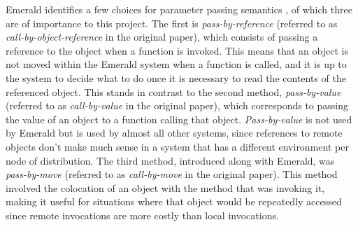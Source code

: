 Emerald identifies a few choices for parameter passing semantics \cite{JulEric1988Fmit}, of which three are of importance to this project. The first is \textit{pass-by-reference} (referred to as \textit{call-by-object-reference} in the original paper), which consists of passing a reference to the object when a function is invoked. This means that an object is not moved within the Emerald system when a function is called, and it is up to the system to decide what to do once it is necessary to read the contents of the referenced object. This stands in contrast to the second method, \textit{pass-by-value} (referred to as \textit{call-by-value} in the original paper), which corresponds to passing the value of an object to a function calling that object. \textit{Pass-by-value} is not used by Emerald but is used by almost all other systems, since references to remote objects don't make much sense in a system that has a different environment per node of distribution. The third method, introduced along with Emerald, was \textit{pass-by-move} (referred to as \textit{call-by-move} in the original paper). This method involved the colocation of an object with the method that was invoking it, making it useful for situations where that object would be repeatedly accessed since remote invocations are more costly than local invocations. 